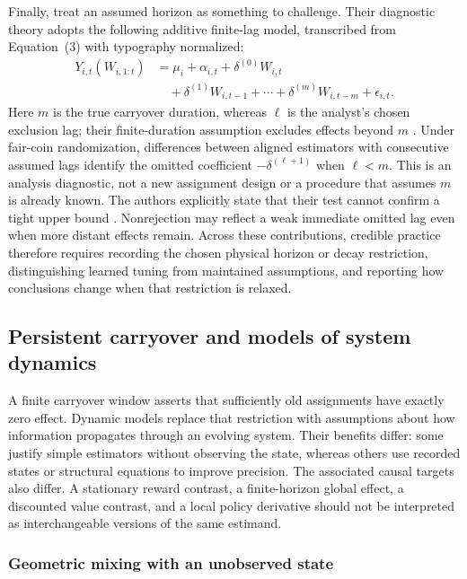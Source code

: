 Finally, \citet{carryover2025} treat an assumed horizon as something to challenge. Their diagnostic theory adopts the following additive finite-lag model, transcribed from Equation~(3) with typography normalized:
\begin{equation}\label{eq:carryover-diagnostic-model}
\begin{aligned}
Y_{i,t}(W_{i,1:t})
 &=\mu_i+\alpha_{i,t}+\delta^{(0)}W_{i,t}\\
 &\quad+\delta^{(1)}W_{i,t-1}+\cdots+\delta^{(m)}W_{i,t-m}+\epsilon_{i,t}.
\end{aligned}
\end{equation}
Here $m$ is the true carryover duration, whereas $\ell$ is the analyst's chosen exclusion lag; their finite-duration assumption excludes effects beyond $m$ \citep[Assumption~2, p.~2; Eq.~(3), p.~3]{carryover2025}. Under fair-coin randomization, differences between aligned estimators with consecutive assumed lags identify the omitted coefficient $-\delta^{(\ell+1)}$ when $\ell<m$. This is an analysis diagnostic, not a new assignment design or a procedure that assumes $m$ is already known. The authors explicitly state that their test cannot confirm a tight upper bound \citep[Section~3.1, p.~3]{carryover2025}. Nonrejection may reflect a weak immediate omitted lag even when more distant effects remain. Across these contributions, credible practice therefore requires recording the chosen physical horizon or decay restriction, distinguishing learned tuning from maintained assumptions, and reporting how conclusions change when that restriction is relaxed.

\subsection{Persistent carryover and models of system dynamics}
\label{sec:dynamic}

A finite carryover window asserts that sufficiently old assignments have exactly zero effect. Dynamic models replace that restriction with assumptions about how information propagates through an evolving system. Their benefits differ: some justify simple estimators without observing the state, whereas others use recorded states or structural equations to improve precision. The associated causal targets also differ. A stationary reward contrast, a finite-horizon global effect, a discounted value contrast, and a local policy derivative should not be interpreted as interchangeable versions of the same estimand.

\subsubsection{Geometric mixing with an unobserved state}

